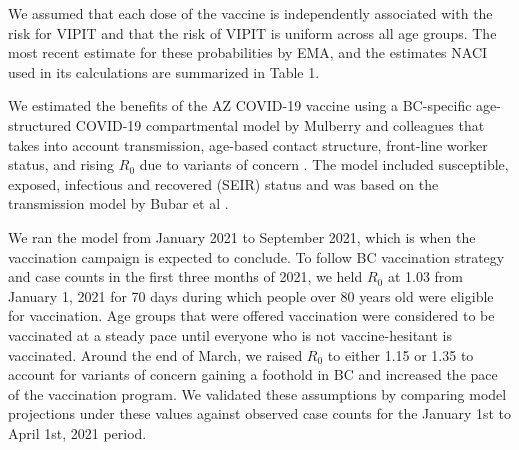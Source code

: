\documentclass[]{interact}
\theoremstyle{plain}%
\theoremstyle{definition}
\theoremstyle{remark}
\begin{document}
We assumed that each dose of the vaccine is independently associated
with the risk for VIPIT and that the risk of VIPIT is uniform across all
age groups. The most recent estimate for these probabilities by EMA, and
the estimates NACI used in its calculations are summarized in Table 1.

We estimated the benefits of the AZ COVID-19 vaccine using a BC-specific
age-structured COVID-19 compartmental model by Mulberry and colleagues
that takes into account transmission, age-based contact structure,
front-line worker status, and rising \(R_0\) due to variants of concern
\citep{mulberry_vaccine_2021}. The model included susceptible, exposed,
infectious and recovered (SEIR) status and was based on the transmission
model by Bubar et al \citep{bubar_model-informed_2021}.

We ran the model from January 2021 to September 2021, which is when the
vaccination campaign is expected to conclude. To follow BC vaccination
strategy and case counts in the first three months of 2021, we held
\(R_0\) at 1.03 from January 1, 2021 for 70 days during which people
over 80 years old were eligible for vaccination. Age groups that were
offered vaccination were considered to be vaccinated at a steady pace
until everyone who is not vaccine-hesitant is vaccinated. Around the end
of March, we raised \(R_0\) to either 1.15 or 1.35 to account for
variants of concern gaining a foothold in BC and increased the pace of
the vaccination program. We validated these assumptions by comparing
model projections under these values against observed case counts for
the January 1st to April 1st, 2021 period.
\end{document}
